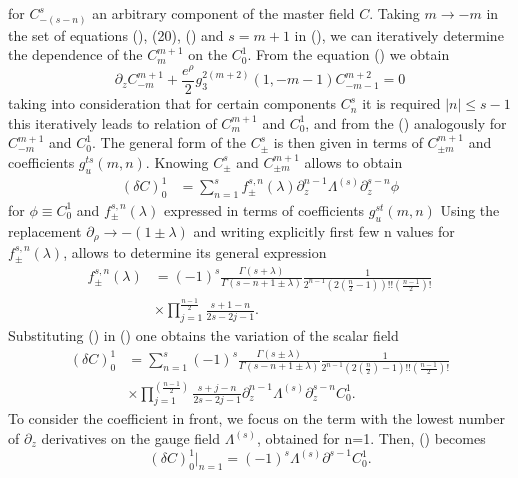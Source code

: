 \documentclass[prd,superscriptaddress,twocolumn,10pt]{revtex4}
\begin{document}
for $C^s_{-(s-n)}$ an arbitrary component of the master field $C$.
Taking $m\rightarrow -m$ in the set of equations (), (20), () and $s=m+1$ in (), we can iteratively determine the dependence of the $C^{m+1}_m$ on the $C_0^1$. From the equation () we obtain
\begin{equation}
\partial_z C_{-m}^{m+1}+\frac{e^{\rho}}{2}g_3^{2(m+2)}(1,-m-1)C^{m+2}_{-m-1}=0
\end{equation}
taking into consideration that for certain components $C_n^s$ it is required $|n|\leq s-1$ this iteratively leads to relation of $C_m^{m+1}$ and $C_0^1$, and from  
the () analogously for $C^{m+1}_{-m}$ and $C_0^1$.
The general form of the $C^s_{\pm}$ is
then given in terms of $C^{m+1}_{\pm m}$ and coefficients $g_u^{ts}(m,n)$.
Knowing $C^s_{\pm}$ and $C^{m+1}_{\pm m}$ allows to obtain  
\begin{align} 
(\delta C)^1_0&=\sum_{n=1}^sf_{\pm}^{s,n}(\lambda)\partial_z^{n-1}\Lambda^{(s)}\partial_z^{s-n}\phi 
\end{align}
for $\phi\equiv C_0^1$ and $f^{s,n}_{\pm}(\lambda)$ expressed in terms  of coefficients $g_u^{st}(m,n)$
Using the replacement $\partial_{\rho}\rightarrow-(1\pm\lambda)$ 
and 
 writing explicitly first few n values for $f_{\pm}^{s,n}(\lambda)$, allows to determine its general expression 
\begin{align}
f_{\pm}^{s,n}(\lambda)&=(-1)^s\frac{\Gamma(s+\lambda)}{\Gamma(s-n+1\pm\lambda)}\frac{1}{2^{n-1}(2(\frac{n}{2}-1))!!\left(\frac{n-1}{2}\right)!}\nonumber\\
&\times\prod_{j=1}^{\frac{n-1}{2}}\frac{s+1-n}{2s-2j-1} .
\end{align}
\noindent Substituting () in () one obtains the variation of the scalar field 
\small
\begin{align}
\displaystyle{(\delta C)_0^1}&\displaystyle{=\sum_{n=1}^{s}(-1)^s\frac{\Gamma(s\pm\lambda)}{\Gamma(s-n+1\pm\lambda)}\frac{1}{2^{n-1}\left(2\left(\frac{n}{2}\right)-1\right)!!\left(\frac{n-1}{2}\right)!} \nonumber}\\ & \times\prod_{j=1}^{\left( \frac{n-1}{2} \right)}\frac{s+j-n}{2s-2j-1}\partial_z^{n-1}\Lambda^{(s)}\partial_z^{s-n}C_0^1. 
\end{align}
\normalsize
To consider the coefficient in front, we focus on the term with the lowest number of $\partial_z$ derivatives on the gauge field $\Lambda^{(s)}$,  obtained for n=1. Then, () becomes
\begin{equation}
(\delta C)_0^1|_{n=1}=(-1)^s\Lambda^{(s)}\partial^{s-1}C_0^1 .
\end{equation}
\end{document}
